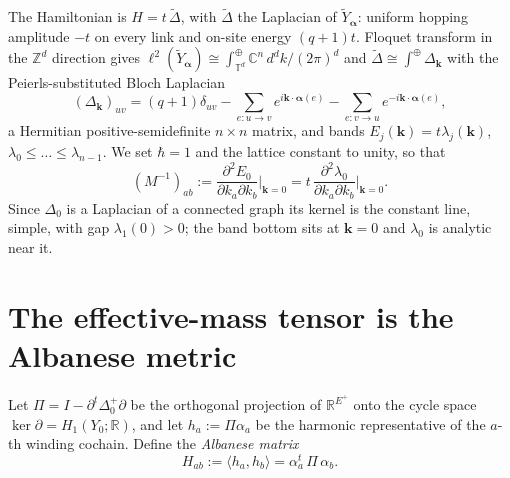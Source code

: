 \documentclass[aps,prb,reprint,amsmath,amssymb,floatfix,superscriptaddress]{revtex4-2}
\theoremstyle{plain}
\theoremstyle{definition}
\theoremstyle{remark}
\newcommand{\Z}{\mathbb{Z}}
\newcommand{\R}{\mathbb{R}}
\newcommand{\C}{\mathbb{C}}
\newcommand{\T}{\mathbb{T}}
\newcommand{\Yt}{\widetilde Y_{\bm\alpha}}
\begin{document}
The Hamiltonian is $H=t\,\widetilde\Delta$, with $\widetilde\Delta$ the Laplacian of $\Yt$:
uniform hopping amplitude $-t$ on every link and on-site energy $(q{+}1)t$. Floquet
transform in the $\Z^{d}$ direction gives
$\ell^{2}(\Yt)\cong\int^{\oplus}_{\T^{d}}\C^{n}\,d^{d}k/(2\pi)^{d}$ and
$\widetilde\Delta\cong\int^{\oplus}\Delta_{\bm k}$ with the Peierls-substituted Bloch
Laplacian
\begin{equation}\label{eq:bloch}
(\Delta_{\bm k})_{uv}=(q{+}1)\delta_{uv}
-\!\!\sum_{e\colon u\to v}\!\! e^{i\bm k\cdot\bm\alpha(e)}
-\!\!\sum_{e\colon v\to u}\!\! e^{-i\bm k\cdot\bm\alpha(e)} ,
\end{equation}
a Hermitian positive-semidefinite $n\times n$ matrix, and bands
$E_j(\bm k)=t\lambda_j(\bm k)$, $\lambda_0\le\dots\le\lambda_{n-1}$. We set $\hbar=1$ and
the lattice constant to unity, so that
\begin{equation}\label{eq:massdef}
(M^{-1})_{ab}:=\frac{\partial^{2}E_0}{\partial k_a\partial k_b}\Big|_{\bm k=0}
=t\,\frac{\partial^{2}\lambda_0}{\partial k_a\partial k_b}\Big|_{\bm k=0}.
\end{equation}
Since $\Delta_0$ is a Laplacian of a connected graph its kernel is the constant line, simple,
with gap $\lambda_1(0)>0$; the band bottom sits at $\bm k=0$ and $\lambda_0$ is analytic
near it.

\section{The effective-mass tensor is the Albanese metric}\label{sec:mass}

Let $\Pi=I-\partial^{t}\Delta_0^{+}\partial$ be the orthogonal projection of
$\R^{E^{+}}$ onto the cycle space $\ker\partial=H_1(Y_0;\R)$, and let
$h_a:=\Pi\alpha_a$ be the harmonic representative of the $a$-th winding cochain. Define the
\emph{Albanese matrix}
\begin{equation}\label{eq:H}
H_{ab}:=\langle h_a,h_b\rangle=\alpha_a^{t}\,\Pi\,\alpha_b .
\end{equation}
\end{document}
